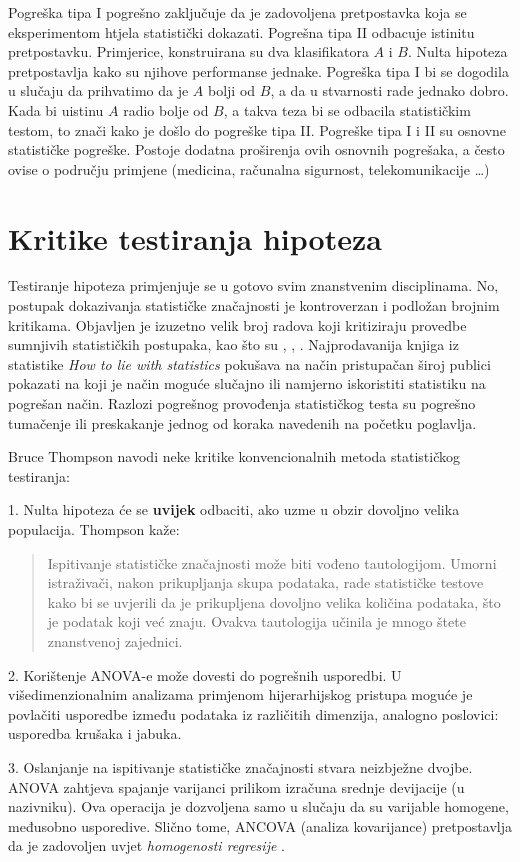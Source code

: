 Pogreška tipa I pogrešno zaključuje da je zadovoljena pretpostavka koja se eksperimentom htjela statistički dokazati. Pogrešna tipa II odbacuje istinitu pretpostavku. Primjerice, konstruirana su dva klasifikatora $A$ i $B$. Nulta hipoteza pretpostavlja kako su njihove performanse jednake. Pogreška tipa I bi se dogodila u slučaju da prihvatimo da je $A$ bolji od $B$, a da u stvarnosti rade jednako dobro. Kada bi uistinu $A$ radio bolje od $B$, a takva teza bi se odbacila statističkim testom, to znači kako je došlo do pogreške tipa II. Pogreške tipa I i II su osnovne statističke pogreške. Postoje dodatna proširenja ovih osnovnih pogrešaka, a često ovise o području primjene (medicina, računalna sigurnost, telekomunikacije \dots)

\section{Kritike testiranja hipoteza}
\label{sec:critique}
Testiranje hipoteza primjenjuje se u gotovo svim znanstvenim disciplinama. No, postupak dokazivanja statističke značajnosti je kontroverzan i podložan brojnim kritikama. Objavljen je izuzetno velik broj radova koji kritiziraju provedbe sumnjivih statističkih postupaka, kao što su \citep{hedges1985statistical}, \citep{dar1994misuse}, \citep{yoccoz1991use}. Najprodavanija knjiga iz statistike \textit{How to lie with statistics} \citep{huff2010lie} pokušava na način pristupačan široj publici pokazati na koji je način moguće slučajno ili namjerno iskoristiti statistiku na pogrešan način. Razlozi pogrešnog provođenja statističkog testa su pogrešno tumačenje ili preskakanje jednog od koraka navedenih na početku poglavlja.

Bruce Thompson \citep{thompson1993use} navodi neke kritike konvencionalnih metoda statističkog testiranja:

1. Nulta hipoteza će se \textbf{uvijek} odbaciti, ako uzme u obzir dovoljno velika populacija. Thompson kaže:
	
\begin{quote}
Ispitivanje statističke značajnosti može biti vođeno tautologijom. Umorni istraživači, nakon prikupljanja skupa podataka, rade statističke testove kako bi se uvjerili da je prikupljena dovoljno velika količina podataka, što je podatak koji već znaju. Ovakva tautologija učinila je mnogo štete znanstvenoj zajednici.
\end{quote}

2. Korištenje ANOVA-e može dovesti do pogrešnih usporedbi. U višedimenzionalnim analizama primjenom hijerarhijskog pristupa moguće je povlačiti usporedbe između podataka iz različitih dimenzija, analogno poslovici: usporedba krušaka i jabuka. 

3. Oslanjanje na ispitivanje statističke značajnosti stvara neizbježne dvojbe. \\  ANOVA zahtjeva spajanje varijanci prilikom izračuna srednje devijacije (u nazivniku). Ova operacija je dozvoljena samo u slučaju da su varijable homogene, međusobno usporedive. Slično tome, ANCOVA (analiza kovarijance) pretpostavlja da je zadovoljen uvjet \textit{homogenosti regresije} . 





